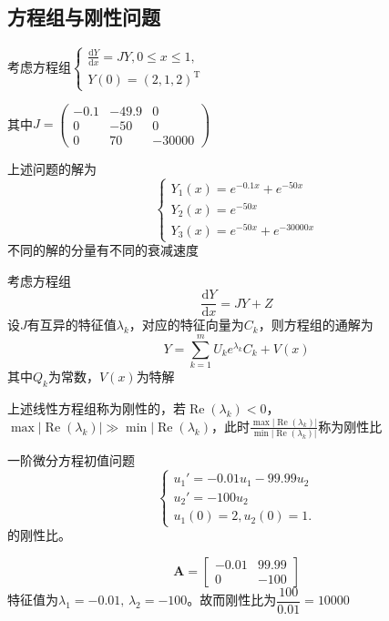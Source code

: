 \subsection{方程组与刚性问题}
\begin{example}
    考虑方程组$\begin{cases}\frac{\mathrm{d}Y}{\mathrm{d}x}=JY,0\leq x\leq 1,\\Y(0)=(2,1,2)^\mathrm{T}\end{cases}$

    其中$J=\begin{pmatrix}-0.1&-49.9&0\\0&-50&0\\0&70&-30000\end{pmatrix}$
    \begin{solution}
        上述问题的解为
        \[
            \begin{cases}
                Y_1(x) = e^{-0.1x}+e^{-50x}\\
                Y_{2}(x) = e^{-50x}\\
                Y_3(x) = e^{-50x}+e^{-30000x}
            \end{cases}
        \]
        \colorbox{red!50}{不同的解的分量有不同的衰减速度}
    \end{solution}
\end{example}
考虑方程组
\[
    \dfrac{\mathrm{d}Y}{\mathrm{d}x} = JY + Z
\]
设$J$有互异的特征值$\lambda_k$，对应的特征向量为$C_{k}$，则方程组的通解为
\[
    Y = \sum_{k = 1}^mU_ke^{\lambda_k}C_{k} + V(x)
\]
其中$Q_k$为常数，$V(x)$为特解
\begin{definition}[刚性]
    上述线性方程组称为刚性的，若$\operatorname{Re}(\lambda_k)<0$，$\max |\operatorname{Re}(\lambda_k)|\gg \min |\operatorname{Re}(\lambda_k)$，此时$\frac{\max |\operatorname{Re}(\lambda_k)|}{ \min |\operatorname{Re}(\lambda_k)|}$称为刚性比
\end{definition}
\begin{example}
    一阶微分方程初值问题
    \[
        \begin{cases}
        u_1'=-0.01u_1-99.99u_2\\
        u_2'=-100u_2\\
        u_1(0)=2,u_2(0)=1.
        \end{cases}
    \]
    的刚性比。
    \begin{solution}
        \[
            \boldsymbol{A} = 
                \begin{bmatrix}
                    -0.01 & 99.99\\
                    0 & -100
                \end{bmatrix}
        \]
        特征值为$\lambda_1 = -0.01,\,\lambda_2 = -100$。故而刚性比为$\dfrac{100}{0.01} = 10000$
    \end{solution}
\end{example}
